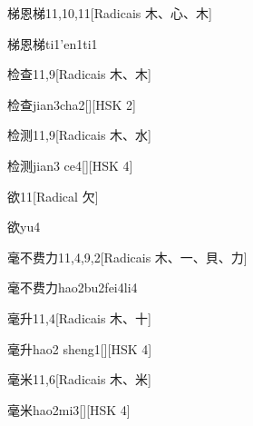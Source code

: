 \begin{entry}{梯恩梯}{11,10,11}[Radicais ⽊、⼼、⽊]
  \begin{phonetics}{梯恩梯}{ti1'en1ti1}
  \end{phonetics}
\end{entry}

\begin{entry}{检查}{11,9}[Radicais ⽊、⽊]
  \begin{phonetics}{检查}{jian3cha2}[][HSK 2]
  \end{phonetics}
\end{entry}

\begin{entry}{检测}{11,9}[Radicais ⽊、⽔]
  \begin{phonetics}{检测}{jian3 ce4}[][HSK 4]
  \end{phonetics}
\end{entry}

\begin{entry}{欲}{11}[Radical ⽋]
  \begin{phonetics}{欲}{yu4}
  \end{phonetics}
\end{entry}

\begin{entry}{毫不费力}{11,4,9,2}[Radicais ⽊、⼀、⾙、⼒]
  \begin{phonetics}{毫不费力}{hao2bu2fei4li4}
  \end{phonetics}
\end{entry}

\begin{entry}{毫升}{11,4}[Radicais ⽊、⼗]
  \begin{phonetics}{毫升}{hao2 sheng1}[][HSK 4]
  \end{phonetics}
\end{entry}

\begin{entry}{毫米}{11,6}[Radicais ⽊、⽶]
  \begin{phonetics}{毫米}{hao2mi3}[][HSK 4]
  \end{phonetics}
\end{entry}

